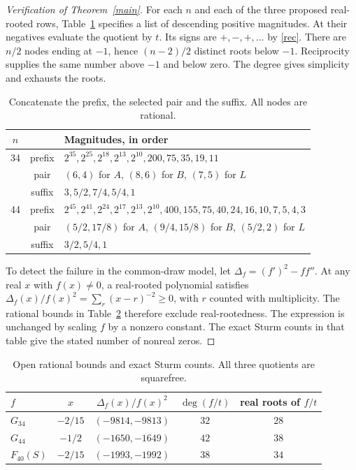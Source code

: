 \documentclass[11pt]{article}
\begin{document}
\begin{proof}[Verification of Theorem~\ref{main}]
For each $n$ and each of the three proposed real-rooted rows, Table~\ref{nodes} specifies a list of descending positive magnitudes. At their negatives evaluate the quotient by $t$. Its signs are $+,-,+,\ldots$ by \eqref{rec}. There are $n/2$ nodes ending at $-1$, hence $(n-2)/2$ distinct roots below $-1$. Reciprocity supplies the same number above $-1$ and below zero. The degree gives simplicity and exhausts the roots.

\begin{table}[ht]
\centering\small
\begin{tabular}{@{}ccl@{}}
\hline
$n$ & & Magnitudes, in order \\ \hline
34 & prefix & $2^{35},2^{25},2^{18},2^{13},2^{10},200,75,35,19,11$\\
   & pair & $(6,4)$ for $A$, $(8,6)$ for $B$, $(7,5)$ for $L$\\
   & suffix & $3,5/2,7/4,5/4,1$\\
44 & prefix & $2^{45},2^{41},2^{24},2^{17},2^{13},2^{10},400,155,75,40,24,16,10,7,5,4,3$\\
   & pair & $(5/2,17/8)$ for $A$, $(9/4,15/8)$ for $B$, $(5/2,2)$ for $L$\\
   & suffix & $3/2,5/4,1$\\ \hline
\end{tabular}
\caption{Concatenate the prefix, the selected pair and the suffix. All nodes are rational.}\label{nodes}
\end{table}

To detect the failure in the common-draw model, let $\Delta_f=(f')^2-ff''$. At any real $x$ with $f(x)\ne0$, a real-rooted polynomial satisfies $\Delta_f(x)/f(x)^2=\sum_{r}(x-r)^{-2}\ge0$, with $r$ counted with multiplicity. The rational bounds in Table~\ref{gap} therefore exclude real-rootedness. The expression is unchanged by scaling $f$ by a nonzero constant. The exact Sturm counts in that table give the stated number of nonreal zeros.
\end{proof}

\begin{table}[ht]
\centering
\begin{tabular}{@{}lcccc@{}}
\hline
$f$ & $x$ & $\Delta_f(x)/f(x)^2$ & $\deg(f/t)$ & real roots of $f/t$\\ \hline
$G_{34}$ & $-2/15$ & $(-9814,-9813)$ & $32$ & $28$\\
$G_{44}$ & $-1/2$  & $(-1650,-1649)$ & $42$ & $38$\\
$F_{40}(S)$ & $-2/15$ & $(-1993,-1992)$ & $38$ & $34$\\ \hline
\end{tabular}
\caption{Open rational bounds and exact Sturm counts. All three quotients are squarefree.}\label{gap}
\end{table}
\end{document}
